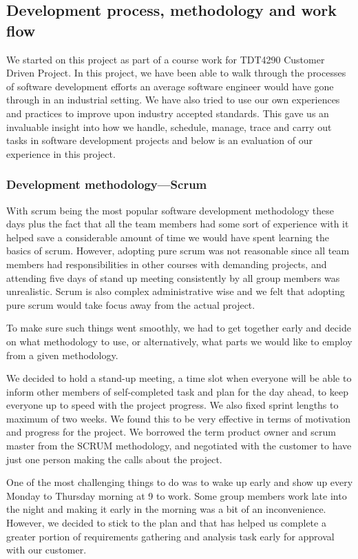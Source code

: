 \subsection{Development process, methodology and work flow}

We started on this project as part of a course work for TDT4290 Customer
Driven Project. In this project, we have been able to walk through the processes
of software development efforts an average software engineer would have gone
through in an industrial setting. We have also tried to use our own experiences
and practices to improve upon industry accepted standards.
This gave us an invaluable insight into how we handle, schedule,
manage, trace and carry out tasks in software development projects and below is
an evaluation of our experience in this project.

	\subsubsection{Development methodology---Scrum}

With scrum being the most popular software development methodology these days
plus the fact that all the team members had some sort of experience with it
helped save a considerable amount of time we would have spent learning the
basics of scrum. However, adopting pure scrum  was not reasonable since all team
members had responsibilities in other courses with demanding projects, and
attending five days of stand up meeting consistently by all group members was
unrealistic. Scrum is also complex administrative wise and we felt that adopting
pure scrum would take focus away from the actual project.

To make sure such things went smoothly, we had to get together early and decide
on what methodology to use, or alternatively, what parts we would like to
employ from a given methodology.

We decided to hold a stand-up meeting, a time slot when everyone will
be able to inform other members of self-completed task and plan for the day
ahead, to keep everyone up to speed with the project progress. We also fixed
sprint lengths to maximum of two weeks. We found this to be very effective in
terms of motivation and progress for the project. We borrowed the term product
owner and scrum master from the SCRUM methodology, and negotiated with the
customer to have just one person making the calls about the project.

One of the most challenging things to do was to wake up early and show up every
Monday to Thursday morning at 9 to work. Some group members work late
into the night and making it early in the morning was a bit of an inconvenience.
However, we decided to stick to the plan and that has helped us complete a greater
portion of requirements gathering and analysis task early for approval with our
customer.

